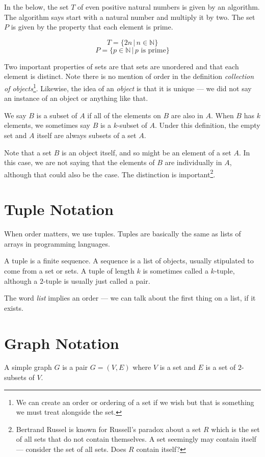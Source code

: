 \documentclass{iansnotes}
\begin{document}
  In the below, the set $T$ of even positive natural numbers is given by an algorithm.
  The algorithm says start with a natural number and multiply it by two.
  The set $P$ is given by the property that each element is prime.

  $$ T = \{ 2n \, | \, n \in \mathbb{N} \} $$
  $$ P = \{ p \in \mathbb{N} \, | \, p \textrm{ is prime} \} $$

  Two important properties of sets are that sets are unordered and that each element is distinct.
  Note there is no mention of order in the definition \emph{collection of objects}\footnote{We can create an order or ordering of a set if we wish but that is something we must treat alongside the set.}.
  Likewise, the idea of an \emph{object} is that it is unique --- we did not say an instance of an object or anything like that.

  We say $B$ is a subset of $A$ if all of the elements on $B$ are also in $A$.
  When $B$ has $k$ elements, we sometimes say $B$ is a $k$-subset of $A$.
  Under this definition, the empty set and $A$ itself are always subsets of a set $A$.

  Note that a set $B$ is an object itself, and so might be an element of a set $A$.
  In this case, we are not saying that the elements of $B$ are individually in $A$, although that could also be the case.
  The distinction is important\footnote{Bertrand Russel is known for Russell's paradox about a set $R$ which is the set of all sets that do not contain themselves. A set seemingly may contain itself --- consider the set of all sets. Does $R$ contain itself?}.


\section{Tuple Notation}
  When order matters, we use tuples.
  Tuples are basically the same as lists of arrays in programming languages.

  A tuple is a finite sequence\autocite[6]{sipser}.
  A sequence is a list of objects, usually stipulated to come from a set or sets.
  A tuple of length $k$ is sometimes called a $k$-tuple, although a $2$-tuple is usually just called a pair.

  The word \emph{list} implies an order --- we can talk about the first thing on a list, if it exists.

\section{Graph Notation}
  A simple graph $G$ is a pair \(G = (V,E)\) where $V$ is a set and $E$ is a set of $2$-subsets of $V$.
\end{document}
